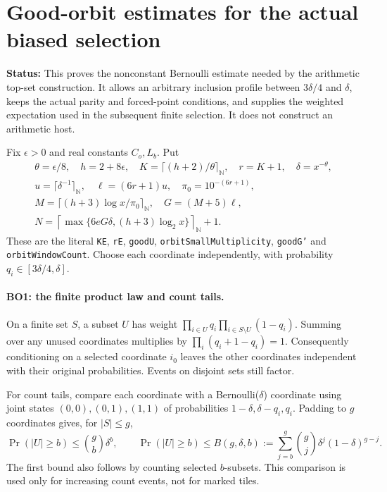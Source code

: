\documentclass[11pt,a4paper]{article}
\numberwithin{equation}{section}
\theoremstyle{remark}\newtheorem{remark}[theorem]{Remark}
\newcommand{\status}[1]{\textbf{Status:} #1}
\begin{document}
\section{Good-orbit estimates for the actual biased selection}
\label{sec:biased-orbits}

\status{This proves the nonconstant Bernoulli estimate needed by the
arithmetic top-set construction. It allows an arbitrary inclusion profile
between $3\delta/4$ and $\delta$, keeps the actual parity and forced-point
conditions, and supplies the weighted expectation used in the subsequent
finite selection. It does not construct an arithmetic host.}

Fix $\epsilon>0$ and real constants $C_o,L_b$. Put
\[
\begin{gathered}
 \theta=\epsilon/8,\quad h=2+8\epsilon,\quad
 K=\lceil(h+2)/\theta\rceil_{\mathbb N},\quad r=K+1,
 \quad\delta=x^{-\theta},\\
 u=\lceil\delta^{-1}\rceil_{\mathbb N},\quad
 \ell=(6r+1)u,\quad\pi_0=10^{-(6r+1)},\\
 M=\lceil(h+3)\log x/\pi_0\rceil_{\mathbb N},\quad
 G=(M+5)\ell,\\
 N=\left\lceil\max\{6eG\delta,(h+3)\log_2x\}\right\rceil_{\mathbb N}+1.
\end{gathered}                                                   \tag{BO.1}
\]
These are the literal \texttt{KE}, \texttt{rE}, \texttt{goodU},
\texttt{orbitSmallMultiplicity}, \texttt{goodG'} and
\texttt{orbitWindowCount}. Choose each coordinate independently, with
probability $q_i\in[3\delta/4,\delta]$.

\paragraph{BO1: the finite product law and count tails.}
On a finite set $S$, a subset $U$ has weight
$\prod_{i\in U}q_i\prod_{i\in S\setminus U}(1-q_i)$.
Summing over any unused coordinates multiplies by
$\prod_i(q_i+1-q_i)=1$. Consequently conditioning on a selected
coordinate $i_0$ leaves the other coordinates independent with their
original probabilities. Events on disjoint sets still factor.

For count tails, compare each coordinate with a Bernoulli($\delta$)
coordinate using joint states $(0,0),(0,1),(1,1)$ of probabilities
$1-\delta,\delta-q_i,q_i$. Padding to $g$ coordinates gives, for
$|S|\le g$,
\[
 \Pr(|U|\ge b)\le \binom{g}{b}\delta^b,
 \qquad
 \Pr(|U|\ge b)\le
 B(g,\delta,b):=\sum_{j=b}^{g}\binom{g}{j}\delta^j(1-\delta)^{g-j}.
                                                               \tag{BO.2}
\]
The first bound also follows by counting selected $b$-subsets. This
comparison is used only for increasing count events, not for marked tiles.
\end{document}
